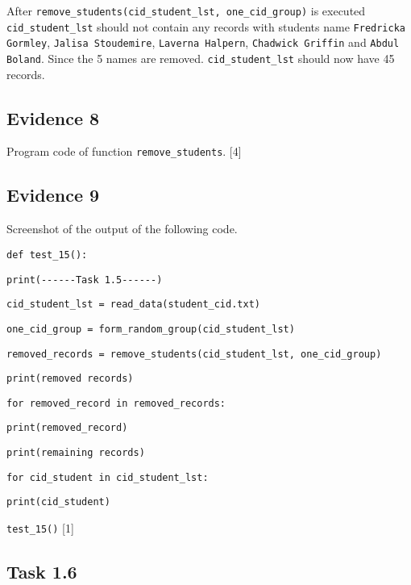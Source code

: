 After \texttt{remove\_students(cid\_student\_lst, one\_cid\_group)}
is executed \texttt{cid\_student\_lst} should not contain any records
with students name \texttt{Fredricka Gormley}, \texttt{Jalisa Stoudemire},
\texttt{Laverna Halpern}, \texttt{Chadwick Griffin} and \texttt{Abdul
Boland}. Since the 5 names are removed. \texttt{cid\_student\_lst}
should now have 45 records. 

\subsection*{Evidence 8 }

Program code of function \texttt{remove\_students}. \hfill{}{[}4{]}

\subsection*{Evidence 9 }

Screenshot of the output of the following code. 

\noindent %
\noindent\begin{minipage}[t]{1\columnwidth}%
\texttt{def test\_15(): }

\texttt{\qquad{}print(\textquotedbl -{}-{}-{}-{}-{}-Task 1.5-{}-{}-{}-{}-{}-\textquotedbl ) }

\texttt{\qquad{}cid\_student\_lst = read\_data(\textquotedbl student\_cid.txt\textquotedbl ) }

\texttt{\qquad{}one\_cid\_group = form\_random\_group(cid\_student\_lst) }

\texttt{\qquad{}removed\_records = remove\_students(cid\_student\_lst,
one\_cid\_group) }

\texttt{\qquad{}print(\textquotedbl removed records\textquotedbl ) }

\texttt{\qquad{}for removed\_record in removed\_records: }

\texttt{\qquad{}\qquad{}print(removed\_record) }

\texttt{\qquad{}print(\textquotedbl remaining records\textquotedbl ) }

\texttt{\qquad{}for cid\_student in cid\_student\_lst: }

\texttt{\qquad{}\qquad{}print(cid\_student) }

\texttt{test\_15()} \hfill{} {[}1{]}%
\end{minipage}

\subsection*{Task 1.6 }


